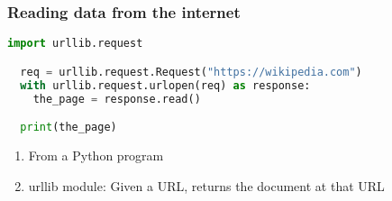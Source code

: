 \documentclass{beamer}
\begin{document}
%
%
\begin{frame}[fragile]
  \frametitle{Reading data from the internet}
  \begin{lstlisting}[language=Python]
  import urllib.request

  req = urllib.request.Request("https://wikipedia.com")
  with urllib.request.urlopen(req) as response:
    the_page = response.read()

  print(the_page)
  \end{lstlisting} 
  \vfill
  \begin{enumerate}[A]
    \item From a Python program
    \item urllib module: Given a URL, returns the document at that URL
  \end{enumerate}
\end{frame}
\end{document}
